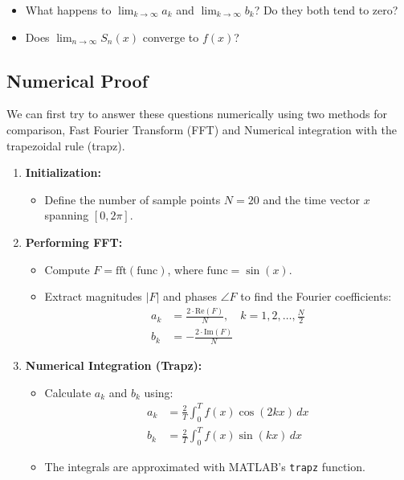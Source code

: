 \documentclass[12pt]{report} %
\begin{document}
\begin{itemize}
    \item What happens to \( \lim_{k \to \infty} a_k \) and \( \lim_{k \to \infty} b_k \)? Do they both tend to zero?
    \item Does \( \lim_{n \to \infty} S_n(x) \) converge to \( f(x) \)?
\end{itemize}

\subsection{Numerical Proof}
We can first try to answer these questions numerically using two methods for comparison, Fast Fourier Transform (FFT) and Numerical integration with the trapezoidal rule (trapz).
\begin{enumerate}
    \item \textbf{Initialization:} 
    \begin{itemize}
        \item Define the number of sample points \( N = 20 \) and the time vector \( x \) spanning \( [0, 2\pi] \).
    \end{itemize}
    
    \item \textbf{Performing FFT:}
    \begin{itemize}
        \item Compute \( F = \text{fft}(\text{func}) \), where \(\text{func} = \sin(x)\).
        \item Extract magnitudes \( |F| \) and phases \( \angle F \) to find the Fourier coefficients:
        \begin{align*}
            a_k &= \frac{2 \cdot \text{Re}(F)}{N}, \quad k = 1, 2, \ldots, \frac{N}{2} \\
            b_k &= -\frac{2 \cdot \text{Im}(F)}{N}
        \end{align*}
    \end{itemize}
    
    \item \textbf{Numerical Integration (Trapz):}
    \begin{itemize}
        \item Calculate \( a_k \) and \( b_k \) using:
        \begin{align*}
            a_k &= \frac{2}{T} \int_0^T f(x) \cos(2kx) \, dx \\
            b_k &= \frac{2}{T} \int_0^T f(x) \sin(kx) \, dx
        \end{align*}
        \item The integrals are approximated with MATLAB's \texttt{trapz} function.
    \end{itemize}
    

\end{enumerate}
\end{document}
